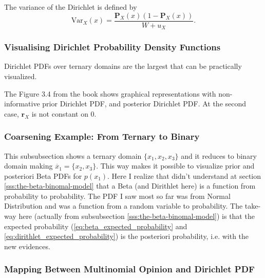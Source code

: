The variance of the Dirichlet is defined by
\begin{equation}
    \mathrm{Var}_X(x) = \dfrac{\mathbf{P}_X(x)(1 - \mathbf{P}_X(x))}{W + u_X}\text{.}
\end{equation}

\subsubsection{Visualising Dirichlet Probability Density Functions}

Dirichlet PDFs over ternary domains are the largest that can be practically visualized.

The Figure 3.4 from the book shows graphical representations with non-informative prior Dirichlet PDF, and posterior Dirichlet PDF. At the second case, $\mathbf{r}_X$ is not constant on $0$.

\subsubsection{Coarsening Example: From Ternary to Binary}

This subsubsection shows a ternary domain $\{x_1, x_2, x_3\}$ and it reduces to binary domain making $\overline{x}_1 = \{x_2, x_3\}$. This way makes it possible to visualize prior and posteriori Beta PDFs for $p(x_1)$. Here I realize that didn't understand at section \ref{sss:the-beta-binomal-model} that a Beta (and Dirithlet here) is a function from probability to probability. The PDF I saw most so far was from Normal Distribution and was a function from a random variable to probability. The take-way here (actually from subsubsection \ref{sss:the-beta-binomal-model}) is that the expected probability (\ref{eq:beta_expected_probability} and \ref{eq:dirithlet_expected_probability}) is the posteriori probability, i.e. with the new evidences.

\subsubsection{Mapping Between Multinomial Opinion and Dirichlet PDF}


